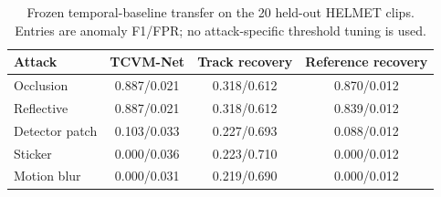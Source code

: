 \begin{table}[tbp]
\caption{Frozen temporal-baseline transfer on the 20 held-out HELMET clips. Entries are anomaly F1/FPR; no attack-specific threshold tuning is used.}
\label{tab:crossattack_temporal_baselines}
\scriptsize
\centering
\setlength{\tabcolsep}{4pt}
\begin{tabular}{lccc}
\toprule
Attack & TCVM-Net & Track recovery & Reference recovery \\
\midrule
Occlusion & 0.887/0.021 & 0.318/0.612 & 0.870/0.012 \\
Reflective & 0.887/0.021 & 0.318/0.612 & 0.839/0.012 \\
Detector patch & 0.103/0.033 & 0.227/0.693 & 0.088/0.012 \\
Sticker & 0.000/0.036 & 0.223/0.710 & 0.000/0.012 \\
Motion blur & 0.000/0.031 & 0.219/0.690 & 0.000/0.012 \\
\bottomrule
\end{tabular}
\end{table}
